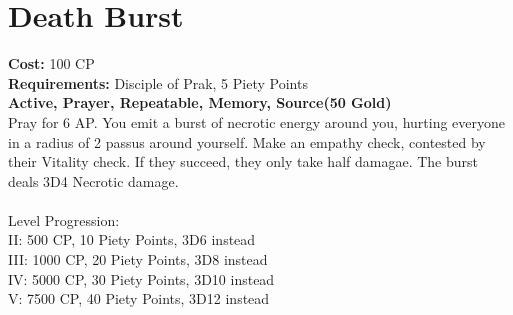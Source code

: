 \section{Death Burst}
\textbf{Cost:} 100 CP\\
\textbf{Requirements:} Disciple of Prak, 5 Piety Points \\
\textbf{Active, Prayer, Repeatable, Memory, Source(50 Gold)}\\
Pray for 6 AP. You emit a burst of necrotic energy around you, hurting everyone in a radius of 2 passus around yourself. Make an empathy check, contested by their Vitality check. If they succeed, they only take half damagae. The burst deals 3D4 Necrotic damage.\\
\\
Level Progression:\\
II: 500 CP, 10 Piety Points, 3D6 instead\\
III: 1000 CP, 20 Piety Points, 3D8 instead\\
IV: 5000 CP, 30 Piety Points, 3D10 instead\\
V: 7500 CP, 40 Piety Points, 3D12 instead\\